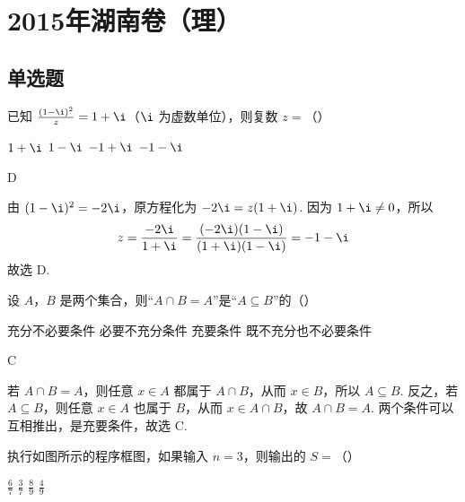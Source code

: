 \chapter{2015年湖南卷（理）}

\section{单选题}

\begin{problem}
已知 \(\frac{(1 - \i)^2}{z} = 1 + \i\)（\(\i\) 为虚数单位），则复数 \(z =\)（\quad）

\choices
    {\(1 + \i\)}
    {\(1 - \i\)}
    {\(-1 + \i\)}
    {\(-1 - \i\)}
\end{problem}

\begin{answer}
D
\end{answer}

\begin{solution}
由 \((1-\i)^2=-2\i\)，原方程化为 \(-2\i=z(1+\i)\). 因为 \(1+\i\ne0\)，所以
\[
z=\frac{-2\i}{1+\i}=\frac{(-2\i)(1-\i)}{(1+\i)(1-\i)}=-1-\i
\]
故选 D.
\end{solution}

\begin{problem}
设 \(A\)，\(B\) 是两个集合，则“\(A \cap B = A\)”是“\(A \subseteq B\)”的（\quad）

\choices
    {充分不必要条件}
    {必要不充分条件}
    {充要条件}
    {既不充分也不必要条件}
\end{problem}

\begin{answer}
C
\end{answer}

\begin{solution}
若 \(A\cap B=A\)，则任意 \(x\in A\) 都属于 \(A\cap B\)，从而 \(x\in B\)，所以 \(A\subseteq B\). 反之，若 \(A\subseteq B\)，则任意 \(x\in A\) 也属于 \(B\)，从而 \(x\in A\cap B\)，故 \(A\cap B=A\). 两个条件可以互相推出，是充要条件，故选 C.
\end{solution}

\begin{problem}
执行如图所示的程序框图，如果输入 \(n = 3\)，则输出的 \(S =\)（\quad）


\choices
    {\(\frac{6}{7}\)}
    {\(\frac{3}{7}\)}
    {\( \frac{8}{9} \)}
    {\(\frac{4}{9}\)}
\end{problem}

